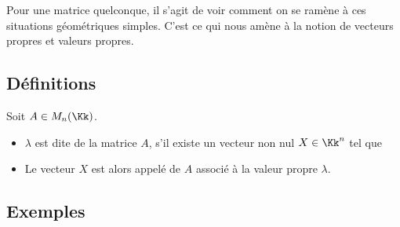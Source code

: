 \documentclass[11pt, class=report,crop=false]{standalone}
\begin{document}
Pour une matrice quelconque, il s'agit de voir comment on se ramène à ces situations géométriques simples. C'est ce qui nous amène à la notion de vecteurs propres et valeurs propres.


\subsection{Définitions}



\begin{definition}
Soit $A \in M_n(\Kk)$.

\begin{itemize}
  \item $\lambda$ est dite  de la matrice $A$, s'il
existe un vecteur non nul $X \in \Kk^n$ tel que 
  
  \item Le vecteur $X$ est alors appelé  de $A$ associé à la valeur propre $\lambda$.
\end{itemize}
\end{definition}

\subsection{Exemples}
 
\end{document}
